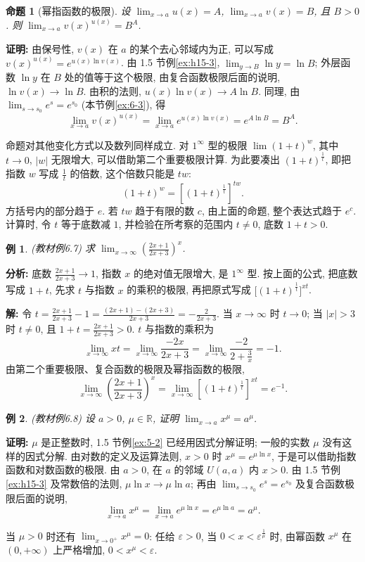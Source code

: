 \documentclass[UTF8,openany]{ctexbook}
\theoremstyle{chinesetextbook}
\newtheorem{example}{例}[section]
\newenvironment{cnproof}{\par\indent\textbf{证明:} \ignorespaces}{\par}
\newenvironment{cnsolution}{\par\indent\textbf{解:} \ignorespaces}{\par}
\newtheorem*{propositionsingle}{命题}
\begin{document}
\begin{propositionsingle}[幂指函数的极限]
设 $\displaystyle\lim_{x\to a}u(x)=A$, $\displaystyle\lim_{x\to a}v(x)=B$, 且 $B>0$. 则 $\displaystyle\lim_{x\to a}v(x)^{u(x)}=B^A$.
\end{propositionsingle}
\begin{cnproof}
由保号性, $v(x)$ 在 $a$ 的某个去心邻域内为正, 可以写成 $v(x)^{u(x)}=e^{u(x)\ln v(x)}$. 由 1.5 节例\ref{ex:h15-3}, $\displaystyle\lim_{y\to B}\ln y=\ln B$; 外层函数 $\ln y$ 在 $B$ 处的值等于这个极限, 由复合函数极限后面的说明, $\ln v(x)\to\ln B$. 由积的法则, $u(x)\ln v(x)\to A\ln B$. 同理, 由 $\displaystyle\lim_{s\to s_0}e^s=e^{s_0}$ (本节例\ref{ex:6-3}), 得
\[
\lim_{x\to a}v(x)^{u(x)}=\lim_{x\to a}e^{u(x)\ln v(x)}=e^{A\ln B}=B^A.
\]
\end{cnproof}
命题对其他变化方式以及数列同样成立. 对 $1^\infty$ 型的极限 $\displaystyle\lim(1+t)^w$, 其中 $t\to0$, $|w|$ 无限增大, 可以借助第二个重要极限计算. 为此要凑出 $(1+t)^{\frac1t}$, 即把指数 $w$ 写成 $\displaystyle\frac1t$ 的倍数, 这个倍数只能是 $tw$:
\[
(1+t)^w=\left[(1+t)^{\frac1t}\right]^{tw}.
\]
方括号内的部分趋于 $e$. 若 $tw$ 趋于有限的数 $c$, 由上面的命题, 整个表达式趋于 $e^c$. 计算时, 令 $t$ 等于底数减 $1$, 并检验在所考察的范围内 $t\ne0$, 底数 $1+t>0$.
\begin{example}\label{ex:6-7}
\textnormal{(教材例6.7)} 求 $\displaystyle\lim_{x\to\infty}\left(\frac{2x+1}{2x+3}\right)^x$.
\end{example}
\par\indent\textbf{分析:} 底数 $\displaystyle\frac{2x+1}{2x+3}\to1$, 指数 $x$ 的绝对值无限增大, 是 $1^\infty$ 型. 按上面的公式, 把底数写成 $1+t$, 先求 $t$ 与指数 $x$ 的乘积的极限, 再把原式写成 $\bigl[(1+t)^{\frac1t}\bigr]^{xt}$.
\begin{cnsolution}
令 $\displaystyle t=\frac{2x+1}{2x+3}-1=\frac{(2x+1)-(2x+3)}{2x+3}=-\frac2{2x+3}$. 当 $x\to\infty$ 时 $t\to0$; 当 $|x|>3$ 时 $t\ne0$, 且 $\displaystyle1+t=\frac{2x+1}{2x+3}>0$. $t$ 与指数的乘积为
\[
\lim_{x\to\infty}xt=\lim_{x\to\infty}\frac{-2x}{2x+3}=\lim_{x\to\infty}\frac{-2}{2+\frac3x}=-1.
\]
由第二个重要极限、复合函数的极限及幂指函数的极限,
\[
\lim_{x\to\infty}\left(\frac{2x+1}{2x+3}\right)^x=\lim_{x\to\infty}\left[(1+t)^{\frac1t}\right]^{xt}=e^{-1}.
\]
\end{cnsolution}
\begin{example}\label{ex:6-8}
\textnormal{(教材例6.8)} 设 $a>0$, $\mu\in\mathbb R$, 证明 $\displaystyle\lim_{x\to a}x^\mu=a^\mu$.
\end{example}
\begin{cnproof}
$\mu$ 是正整数时, 1.5 节例\ref{ex:5-2} 已经用因式分解证明; 一般的实数 $\mu$ 没有这样的因式分解. 由对数的定义及运算法则, $x>0$ 时 $x^\mu=e^{\mu\ln x}$, 于是可以借助指数函数和对数函数的极限. 由 $a>0$, 在 $a$ 的邻域 $U(a,a)$ 内 $x>0$. 由 1.5 节例\ref{ex:h15-3} 及常数倍的法则, $\mu\ln x\to\mu\ln a$; 再由 $\displaystyle\lim_{s\to s_0}e^s=e^{s_0}$ 及复合函数极限后面的说明,
\[
\lim_{x\to a}x^\mu=\lim_{x\to a}e^{\mu\ln x}=e^{\mu\ln a}=a^\mu.
\]
\end{cnproof}
当 $\mu>0$ 时还有 $\displaystyle\lim_{x\to0^+}x^\mu=0$: 任给 $\varepsilon>0$, 当 $0<x<\varepsilon^{\frac1\mu}$ 时, 由幂函数 $x^\mu$ 在 $(0,+\infty)$ 上严格增加, $0<x^\mu<\varepsilon$.
\end{document}
